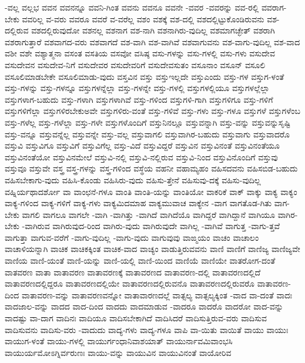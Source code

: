 {-ವಲ್ಲ
ವಲ್ಲಭ
ವವನ
ವವನನ್ನೂ
ವವನಿ-ಗಿಂತ
ವವನು
ವವನೂ
ವವನೇ
-ವವರ
-ವವರನ್ನು
ವವ-ರಲ್ಲಿ
ವವರಾಗ-ಬೇಕು
ವವರಿಲ್ಲ
ವ-ವರು
ವವರೂ
ವವರೆ
ವ-ವರೆಲ್ಲ
ವಶಂ
ವಶಕ್ಕೆ
ವಶ-ದಲ್ಲಿ
ವಶದಲ್ಲಿಟ್ಟುಕೊಂಡಿರುವನು
ವಶ-ದಲ್ಲಿರುವ
ವಶದಲ್ಲಿರುವುದೋ
ವಶನಲ್ಲ
ವಶನಾಗ
ವಶ-ನಾಗಿ
ವಶನಾಗಿರು-ವುದಿಲ್ಲ
ವಶಮಾಗಚ್ಛೇತ್
ವಶರಾಗಿ
ವಶರಾಗುತ್ತಾರೆ
ವಶವಾಗದ-ವರು
ವಶವಾಗದೆ
ವಶ-ವಾಗಿ
ವಶ-ವಾಗಿವೆ
ವಶವಾಗುವನು
ವಶ-ವಾಗು-ವುದಿಲ್ಲ
ವಶ-ವಾದ
ವಶೀ
ವಶೇ
ವಶ್ಯಾತ್ಮನಾ
ವಸಂತ
ವಸತಿಯ
ವಸವೋ
ವಸಿಷ್ಠ
ವಸು-ಗಳನ್ನು
ವಸು-ಗಳಲ್ಲಿ
ವಸು-ಗಳು
ವಸುದೇವ
ವಸುದೇವನ
ವಸುದೇವ-ನಿಗೆ
ವಸುದೇವರ
ವಸುದೇವರಿಗೆ
ವಸುದೇವಸುತಂ
ವಸೂನಾಂ
ವಸೂನ್
ವಸೂಲಿ
ವಸೂಲಿಮಾಡಬೇಕೇ
ವಸೂಲಿಮಾಡು-ವುದು
ವಸ್ತವಿನ
ವಸ್ತು
ವಸ್ತುಇಲ್ಲದೇ
ವಸ್ತುಎಂದು
ವಸ್ತು-ಗಳ
ವಸ್ತುಗ-ಳಂತೆ
ವಸ್ತು-ಗಳನ್ನು
ವಸ್ತು-ಗಳನ್ನೂ
ವಸ್ತುಗಳನ್ನೆಲ್ಲಾ
ವಸ್ತು-ಗಳನ್ನೇ
ವಸ್ತು-ಗಳಲ್ಲಿ
ವಸ್ತುಗಳಲ್ಲಿಯೂ
ವಸ್ತುಗಳಲ್ಲೆಲ್ಲಾ
ವಸ್ತುಗಳಾಗ-ಬಹುದು
ವಸ್ತು-ಗಳಾಗಿ
ವಸ್ತುಗಳಾಗಿವೆ
ವಸ್ತು-ಗಳಿಂದ
ವಸ್ತುಗಳಿ-ಗಾಗಿ
ವಸ್ತುಗಳಿಗೂ
ವಸ್ತು-ಗಳಿಗೆ
ವಸ್ತುಗಳಿಗೆಲ್ಲಾ
ವಸ್ತುಗಳಿರಬೇಕುಅವೇ
ವಸ್ತುಗಳಿರು-ವಂತೆ
ವಸ್ತು-ಗಳಿವೆ
ವಸ್ತು-ಗಳು
ವಸ್ತು-ಗಳೂ
ವಸ್ತುಗಳೆ
ವಸ್ತುಗಳೆಂಬ
ವಸ್ತು-ಗಳೆಲ್ಲ
ವಸ್ತು-ಗಳೆಲ್ಲಾ
ವಸ್ತು-ಗಳೇ
ವಸ್ತುಗಳೊಂದಿಗೆ
ವಸ್ತುನಿನಲ್ಲೂ
ವಸ್ತುವನ್ನಾಗಿ
ವಸ್ತು-ವನ್ನು
ವಸ್ತುವನ್ನುಸೃಷ್ಟಿ
ವಸ್ತು-ವನ್ನೂ
ವಸ್ತುವನ್ನೆಲ್ಲ
ವಸ್ತುವನ್ನೇ
ವಸ್ತು-ವಲ್ಲ
ವಸ್ತುವಾಗಲಿ
ವಸ್ತುವಾಗಿರ-ಬಹುದು
ವಸ್ತುವಾಗು
ವಸ್ತುವಾದರೊ
ವಸ್ತುವಿ
ವಸ್ತುವಿಗೂ
ವಸ್ತುವಿಗೆ
ವಸ್ತುವಿಗೆಲ್ಲ
ವಸ್ತು-ವಿದೆ
ವಸ್ತುವಿದ್ದರೆ
ವಸ್ತುವಿನ
ವಸ್ತುವಿನಂತೆ
ವಸ್ತುವಿನಂತೆಯೂ
ವಸ್ತುವಿನಂತೆಯೋ
ವಸ್ತುವಿನಮೇಲೆ
ವಸ್ತುವಿ-ನಲ್ಲಿ
ವಸ್ತುವಿ-ನಲ್ಲಿರುವ
ವಸ್ತುವಿ-ನಿಂದ
ವಸ್ತುವಿನೊಂದಿಗೆ
ವಸ್ತುವು
ವಸ್ತುವೂ
ವಸ್ತುವೇ
ವಸ್ತ್ರ
ವಸ್ತ್ರ-ಗಳನ್ನು
ವಸ್ತ್ರ-ಗಳಿಂದ
ವಸ್ಥೆಯ
ವಹನೀ
ವಹಾಮ್ಯಹಂ
ವಹಿಸದವನು
ವಹಿಸಬಿಡ-ಬಹುದು
ವಹಿಸಬೇಕಾಗು-ವುದು
ವಹಿಸಿ-ಕೊಂಡು
ವಹಿಸಿರು-ವುದು
ವಹಿಸು-ತ್ತೇನೆ
ವಹಿಸುವು-ದಕ್ಕೆ
ವಹಿಸು-ವುದಿಲ್ಲ
ವಹ್ನಿರ್ಯಥಾದರ್ಶೋ
ವಾ
ವಾಂಛನೆ-ಗಳೂ
ವಾಂತಿ
ವಾಂತಿ-ಯನ್ನು
ವಾಂತಿಯೋ
ವಾಕರಿಕೆ
ವಾಕ್
ವಾಕ್ಕು
ವಾಕ್ಯ
ವಾಕ್ಯಂ
ವಾಕ್ಯ-ಗಳಿಂದ
ವಾಕ್ಯ-ಗಳಿಗೆ
ವಾಕ್ಯ-ಗಳು
ವಾಕ್ಯಮಿದಮಾಹ
ವಾಕ್ಯಮುವಾಚ
ವಾಕ್ಯೇನ
-ವಾಗ
ವಾಗತೊಡ-ಗಿತು
ವಾಗ-ಬೇಕು
ವಾಗಲಿ
ವಾಗಲೂ
ವಾಗಲೇ
-ವಾಗಿ
-ವಾಗಿತ್ತು
-ವಾಗಿದೆ
ವಾಗಿದೆಯೊ
ವಾಗಿದ್ದರೆ
ವಾಗಿದ್ದಾನೆ
ವಾಗಿಯೂ
ವಾಗಿರ-ಬೇಕು
-ವಾಗಿರುವ
ವಾಗಿರುವುದ-ರಿಂದ
ವಾಗಿರು-ವುದು
ವಾಗಿರುವುದೇ
ವಾಗಿಲ್ಲ
-ವಾಗಿವೆ
ವಾಗುತ್ತ
-ವಾಗು-ತ್ತವೆ
ವಾಗುತ್ತಾ
ವಾಗುವ-ವರೆಗೆ
-ವಾಗು-ವುದಿಲ್ಲ
-ವಾಗು-ವುದು
ವಾಗುವುವು
ವಾಙ್ಮಯಂ
ವಾಚಂ
ವಾಚಾಲಂ
ವಾಚಾಳಿಯನ್ನಾಗಿ
ವಾಚಿಕ
ವಾಚಿಕಕ್ಕಿಂತ
ವಾಚಿಕ-ವಾದ
ವಾಚ್ಯಂ
ವಾಡುತ್ತಿರುವವನು
ವಾಣಿ
ವಾಣಿಗೆ
ವಾಣಿಜ್ಯ
ವಾಣಿಜ್ಯವೇ
ವಾಣಿಯ
ವಾಣಿ-ಯಂತೆ
ವಾಣಿ-ಯನ್ನು
ವಾಣಿ-ಯಲ್ಲಿ
ವಾಣಿ-ಯಿಂದ
ವಾಣಿಯೆ
ವಾಣಿಯೇ
ವಾತರೋಗ-ದಂತೆ
ವಾತವರಣ
ವಾತಾ
ವಾತಾವರಣ
ವಾತಾವರಣಕ್ಕೆ
ವಾತಾವರಣದ
ವಾತಾವರಣ-ದಲ್ಲಿ
ವಾತಾವರಣದಲ್ಲಿದೆ
ವಾತಾವರಣದಲ್ಲಿದ್ದರೂ
ವಾತಾವರಣದಲ್ಲಿಯೇ
ವಾತಾವರಣದಲ್ಲಿರುವನೊ
ವಾತಾವರಣದಲ್ಲಿರುವರೊ
ವಾತಾವರಣ-ದಿಂದ
ವಾತಾವರಣ-ವನ್ನು
ವಾತಾವರಣವನ್ನೋ
ವಾತಾವಾರಣದಲ್ಲೆ
ವಾತ್ಸಲ್ಯ
ವಾತ್ಸಲ್ಯಕ್ಕಿಂತ
-ವಾದ
ವಾ-ದಂತೆ
ವಾದಃ
ವಾದಜಾಲ-ವನ್ನು
ವಾದದ
ವಾದ-ದಿಂದ
ವಾದದು
ವಾದಮಾಡುವ
-ವಾದರೂ
ವಾದರೊ
ವಾದರೋ
ವಾದ-ವನ್ನು
ವಾದಷ್ಟು
ವಾ-ದಾಗ
ವಾದಿನಃ
ವಾದಿಯೂ
ವಾದಿಸಬೇಕಾಗಿದೆ
ವಾದಿಸಿದರೆ
ವಾದಿಸುತ್ತಿರುವ-ವರು
ವಾದಿಸುವ
ವಾದಿಸುವನು
ವಾದಿಸು-ವರು
-ವಾದುದು
ವಾದ್ಯ-ಗಳು
ವಾದ್ಯ-ಗಳೂ
ವಾಪಿ
ವಾ-ಯಿತು
ವಾಯಿತೆ
ವಾಯು
ವಾಯುಃ
ವಾಯುಗ-ಳಂತೆ
ವಾಯು-ಗಳಲ್ಲಿ
ವಾಯುರ್ಗಂಧಾನಿವಾಶಯಾತ್
ವಾಯುರ್ನಾವಮಿವಾಂಭಸಿ
ವಾಯುರ್ಯಮೋಽಗ್ನಿರ್ವರುಣಃ
ವಾಯು-ವನ್ನು
ವಾಯುವಿನ
ವಾಯುವಿನಂತೆ
ವಾಯೋರಿವ
}
